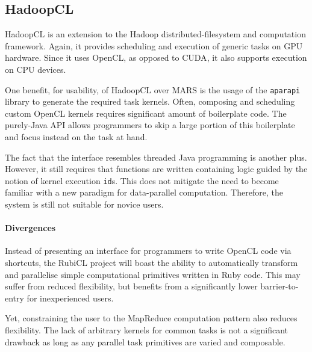 \subsection{HadoopCL}
HadoopCL\cite{hadoopcl} is an extension to the Hadoop\cite{hadoop} distributed-filesystem and computation framework. Again, it provides scheduling and execution of generic tasks on  \ac{GPU} hardware. Since it uses \ac{OpenCL}, as opposed to \ac{CUDA}, it also supports execution on \ac{CPU} devices.

One benefit, for usability, of HadoopCL over MARS is the usage of the \verb|aparapi| library\cite{aparapi} to generate the required task kernels. Often, composing and scheduling custom \ac{OpenCL} kernels requires significant amount of boilerplate code. The purely-Java \ac{API} allows programmers to skip a large portion of this boilerplate and focus instead on the task at hand.

The fact that the interface resembles threaded Java programming is another plus. However, it still requires that functions are written containing logic guided by the notion of kernel execution \verb|id|s. This does not mitigate the need to become familiar with a new paradigm for data-parallel computation. Therefore, the system is still not suitable for novice users.

\paragraph*{Divergences}
Instead of presenting an interface for programmers to write \ac{OpenCL} code via shortcuts, the RubiCL project will boast the ability to automatically transform and parallelise simple computational primitives written in Ruby code. This may suffer from reduced flexibility, but benefits from a significantly lower barrier-to-entry for inexperienced users.

Yet, constraining the user to the MapReduce computation pattern also reduces flexibility. The lack of arbitrary kernels for common tasks is not a significant drawback as long as any parallel task primitives are varied and composable.


